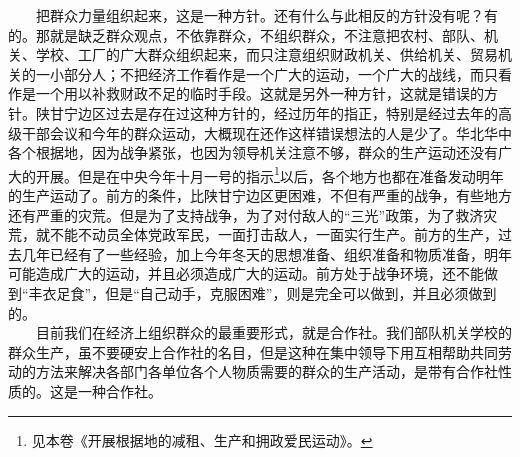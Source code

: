 \documentclass[cn,11pt,chinese]{elegantbook}
\begin{document}
　　把群众力量组织起来，这是一种方针。还有什么与此相反的方针没有呢？有的。那就是缺乏群众观点，不依靠群众，不组织群众，不注意把农村、部队、机关、学校、工厂的广大群众组织起来，而只注意组织财政机关、供给机关、贸易机关的一小部分人；不把经济工作看作是一个广大的运动，一个广大的战线，而只看作是一个用以补救财政不足的临时手段。这就是另外一种方针，这就是错误的方针。陕甘宁边区过去是存在过这种方针的，经过历年的指正，特别是经过去年的高级干部会议和今年的群众运动，大概现在还作这样错误想法的人是少了。华北华中各个根据地，因为战争紧张，也因为领导机关注意不够，群众的生产运动还没有广大的开展。但是在中央今年十月一号的指示\footnote[2]{ 见本卷《开展根据地的减租、生产和拥政爱民运动》。}以后，各个地方也都在准备发动明年的生产运动了。前方的条件，比陕甘宁边区更困难，不但有严重的战争，有些地方还有严重的灾荒。但是为了支持战争，为了对付敌人的“三光”政策，为了救济灾荒，就不能不动员全体党政军民，一面打击敌人，一面实行生产。前方的生产，过去几年已经有了一些经验，加上今年冬天的思想准备、组织准备和物质准备，明年可能造成广大的运动，并且必须造成广大的运动。前方处于战争环境，还不能做到“丰衣足食”，但是“自己动手，克服困难”，则是完全可以做到，并且必须做到的。\\
　　目前我们在经济上组织群众的最重要形式，就是合作社。我们部队机关学校的群众生产，虽不要硬安上合作社的名目，但是这种在集中领导下用互相帮助共同劳动的方法来解决各部门各单位各个人物质需要的群众的生产活动，是带有合作社性质的。这是一种合作社。\\
\end{document}

